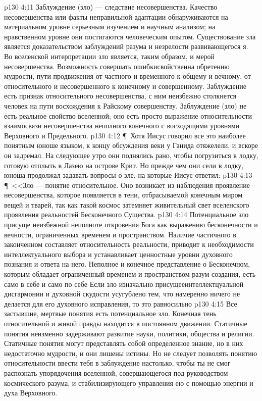 \vs p130 4:11 Заблуждение (зло) --- следствие несовершенства. Качество несовершенства или факты неправильной адаптации обнаруживаются на материальном уровне серьезным изучением и научным анализом; на нравственном уровне они постигаются человеческим опытом. Существование зла является доказательством заблуждений разума и незрелости развивающегося я. Во вселенской интерпретации зло является, таким образом, и мерой несовершенства. Возможность совершать ошибкисвойственна обретению мудрости, пути продвижения от частного и временного к общему и вечному, от относительного и несовершенного к конечному и совершенному. Заблуждение есть признак относительного несовершенства, с ним неизбежно столкнется человек на пути восхождения к Райскому совершенству. Заблуждение (зло) не есть реальное свойство вселенной; оно есть просто выражение относительности взаимосвязи несовершенства неполного конечного с восходящими уровнями Верховного и Предельного.
\vs p130 4:12 \P\ Хотя Иисус говорил все это наиболее понятным юноше языком, к концу обсуждения веки у Ганида отяжелели, и вскоре он задремал. На следующее утро они поднялись рано, чтобы погрузиться в лодку, готовую отплыть в Лазею на острове Крит. Но прежде чем они сели в лодку, юноша продолжал задавать вопросы о зле, на которые Иисус ответил:
\vs p130 4:13 \P\ <<Зло --- понятие относительное. Оно возникает из наблюдения проявление несовершенства, которое появляется в тени, отбрасываемой конечным миром вещей и тварей, так как такой космос затемняет живительный свет вселенского проявления реальностей Бесконечного Существа.
\vs p130 4:14 Потенциальное зло присуще неизбежной неполноте откровения Бога как выражению бесконечности и вечности, ограниченных временем и пространством. Наличие частичного в законченном составляет относительность реальности, приводит к необходимости интеллектуального выбора и устанавливает ценностные уровни духовного познания и ответа на него. Неполное и конечное представление о Бесконечном, которым обладает ограниченный временем и пространством разум создания, есть само в себе и само по себе  Если зло изначально присущееинтеллектцуальной дисгармонии и духовной скудости усугублено тем, что намеренно ничего не делается для его духовного исправления, то это равносильно 
\vs p130 4:15 Все застывшие, мертвые понятия есть потенциальное зло. Конечная тень относительной и живой правды находится в постоянном движении. Статичные понятия неизменно задерживают развитие науки, политики, общества и религии. Статичные понятия могут представлять собой определенное знание, но в них недостаточно мудрости, и они лишены истины. Но не следует позволять понятию относительности ввести тебя в заблуждение настолько, чтобы ты не смог распознать упорядочения вселенной, совершающегося под руководством космического разума, и стабилизирующего управления ею с помощью энергии и духа Верховного.
